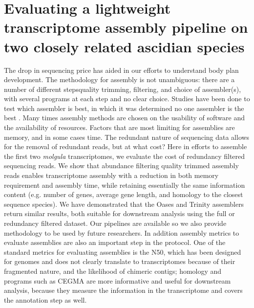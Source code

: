 \section{Evaluating a lightweight transcriptome assembly pipeline on two closely related ascidian species}
The drop in sequencing price has aided in our efforts to understand body plan development. %
The methodology for assembly is not unambiguous: there are a number of different steps\textemdash quality trimming, filtering, and choice of assembler(s), with several programs at each step and no clear choice. Studies have been done to test which assembler is best, in which it was determined no one assembler is the best \cite{clarke_comparative_2013}. Many times assembly methods are chosen on the usability of software and the availability of resources. Factors that are most limiting for assemblies are memory, and in some cases time. The redundant nature of sequencing data allows for the removal of redundant reads, but at what cost? Here in efforts to assemble the first two \textit{molgula} transcriptomes, we evaluate the cost of redundancy filtered sequencing reads. We show that abundance filtering quality trimmed assembly reads enables transcriptome assembly with a reduction in both memory requirement and assembly time, while retaining essentially the same information content (e.g. number of genes, average gene length, and homology to the closest sequence species). We have demonstrated that the Oases and Trinity assemblers return similar results, both suitable for downstream analysis using the full or redundancy filtered dataset. Our pipelines are available so we also provide methodology to be used by future researchers. In addition assembly metrics to evaluate assemblies are also an important step in the protocol. One of the standard metrics for evaluating assemblies is the N50, which has been designed for genomes and does not clearly translate to transcriptomes because of their fragmented nature, and the likelihood of chimeric contigs; homology and programs such as CEGMA are more informative and useful for downstream analysis, because they measure the information in the transcriptome and covers the annotation step as well. %
 

